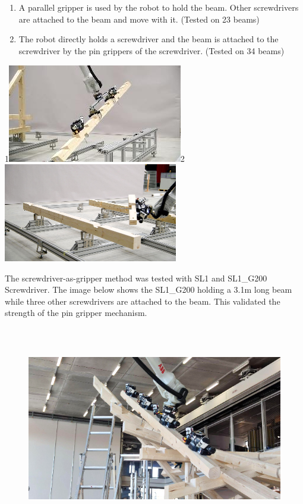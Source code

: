 \documentclass[11pt]{book}
\begin{document}
\begin{enumerate}
	\item A parallel gripper is used by the robot to hold the beam. Other screwdrivers are attached to the beam and move with it. (Tested on 23 beams)

	\item The robot directly holds a screwdriver and the beam is attached to the screwdriver by the pin grippers of the screwdriver.  (Tested on 34 beams)

\end{enumerate}
{\small 1\includegraphics[width=7.64cm,height=4.3cm]{./images/image42.jpeg}2\includegraphics[width=7.64cm,height=4.3cm]{./images/image43.png}}

The screwdriver-as-gripper method was tested with SL1 and SL1\_G200 Screwdriver. The image below shows the SL1\_G200 holding a 3.1m long beam while three other screwdrivers are attached to the beam. This validated the strength of the pin gripper mechanism.

\begin{figure}[H]
\includegraphics[width=15.92cm,height=8.96cm]{./images/image44.png}
\end{figure}
\end{document}
